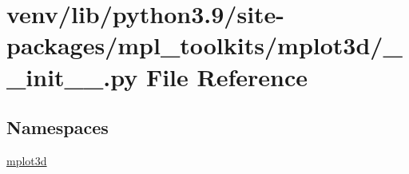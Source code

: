 \hypertarget{venv_2lib_2python3_89_2site-packages_2mpl__toolkits_2mplot3d_2____init_____8py}{}\section{venv/lib/python3.9/site-\/packages/mpl\+\_\+toolkits/mplot3d/\+\_\+\+\_\+init\+\_\+\+\_\+.py File Reference}
\label{venv_2lib_2python3_89_2site-packages_2mpl__toolkits_2mplot3d_2____init_____8py}
\subsection*{Namespaces}
\begin{DoxyCompactItemize}
\item 
 \hyperlink{namespacemplot3d}{mplot3d}
\end{DoxyCompactItemize}
